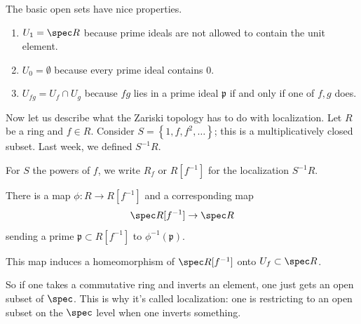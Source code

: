 The basic open sets have nice properties.
\begin{enumerate}
\item $U_1 = \spec R$ because prime ideals are not allowed to
contain the
unit element. 
\item $U_0 = \emptyset$ because every prime ideal contains $0$.
\item $U_{fg} = U_f \cap U_g$ because $fg$ lies in a prime ideal
$\mathfrak{p}$ if and only if one of $f,g$ does.
\end{enumerate}

Now let us describe what the Zariski topology has to do with
localization.
Let $R$ be a ring and $f \in R$. Consider $S = \left\{1, f, f^2,
\dots
\right\}$; this is a multiplicatively closed subset. Last week,
we defined
$S^{-1}R$.

\begin{definition} 
For $S$ the powers of $f$, we write $R_f$ or  $R[f^{-1}]$ for the
localization $S^{-1}R$. 
\end{definition} 

There is  a map $\phi: R \to R[f^{-1}]$ and a corresponding map
\[ \spec R[f^{-1}] \to \spec R  \]
sending a prime $\mathfrak{p} \subset R[f^{-1}]$ to
$\phi^{-1}(\mathfrak{p})$.

\begin{proposition} 
This map induces a homeomorphism of $\spec R[f^{-1}]$ onto $U_f
\subset \spec
R$. 
\end{proposition} 
So if one takes a commutative ring and inverts an element, one
just gets an open
subset of $\spec$. This is why it's called localization: one is
restricting to
an open subset on the $\spec $ level when one inverts something.

